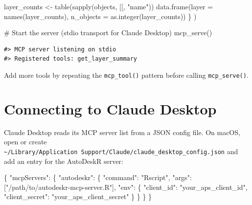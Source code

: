 \documentclass[
  11pt,
  letterpaper,
  DIV=11,
  numbers=noendperiod]{scrreprt}
\newenvironment{Shaded}{\begin{snugshade}}{\end{snugshade}}
\newcommand{\AttributeTok}[1]{\textcolor[rgb]{0.40,0.45,0.13}{#1}}
\newcommand{\CommentTok}[1]{\textcolor[rgb]{0.37,0.37,0.37}{#1}}
\newcommand{\DataTypeTok}[1]{\textcolor[rgb]{0.68,0.00,0.00}{#1}}
\newcommand{\FunctionTok}[1]{\textcolor[rgb]{0.28,0.35,0.67}{#1}}
\newcommand{\NormalTok}[1]{\textcolor[rgb]{0.00,0.23,0.31}{#1}}
\newcommand{\OtherTok}[1]{\textcolor[rgb]{0.00,0.23,0.31}{#1}}
\newcommand{\StringTok}[1]{\textcolor[rgb]{0.13,0.47,0.30}{#1}}
\begin{document}
\begin{Shaded}
\begin{Highlighting}[]
\NormalTok{    layer\_counts }\OtherTok{\textless{}{-}} \FunctionTok{table}\NormalTok{(}\FunctionTok{sapply}\NormalTok{(objects, }\StringTok{\textasciigrave{}}\AttributeTok{[[}\StringTok{\textasciigrave{}}\NormalTok{, }\StringTok{"name"}\NormalTok{))}
    \FunctionTok{data.frame}\NormalTok{(}\AttributeTok{layer =} \FunctionTok{names}\NormalTok{(layer\_counts),}
               \AttributeTok{n\_objects =} \FunctionTok{as.integer}\NormalTok{(layer\_counts))}
\NormalTok{  \}}
\NormalTok{)}

\CommentTok{\# Start the server (stdio transport for Claude Desktop)}
\FunctionTok{mcp\_serve}\NormalTok{()}
\end{Highlighting}
\end{Shaded}

\begin{verbatim}
#> MCP server listening on stdio
#> Registered tools: get_layer_summary
\end{verbatim}

Add more tools by repeating the \texttt{mcp\_tool()} pattern before
calling \texttt{mcp\_serve()}.

\section{Connecting to Claude
Desktop}\label{connecting-to-claude-desktop}

Claude Desktop reads its MCP server list from a JSON config file. On
macOS, open or create
\texttt{\textasciitilde{}/Library/Application\ Support/Claude/claude\_desktop\_config.json}
and add an entry for the AutoDeskR server:

\begin{Shaded}
\begin{Highlighting}[]
\FunctionTok{\{}
  \DataTypeTok{"mcpServers"}\FunctionTok{:} \FunctionTok{\{}
    \DataTypeTok{"autodeskr"}\FunctionTok{:} \FunctionTok{\{}
      \DataTypeTok{"command"}\FunctionTok{:} \StringTok{"Rscript"}\FunctionTok{,}
      \DataTypeTok{"args"}\FunctionTok{:} \OtherTok{[}\StringTok{"/path/to/autodeskr{-}mcp{-}server.R"}\OtherTok{]}\FunctionTok{,}
      \DataTypeTok{"env"}\FunctionTok{:} \FunctionTok{\{}
        \DataTypeTok{"client\_id"}\FunctionTok{:} \StringTok{"your\_aps\_client\_id"}\FunctionTok{,}
        \DataTypeTok{"client\_secret"}\FunctionTok{:} \StringTok{"your\_aps\_client\_secret"}
      \FunctionTok{\}}
    \FunctionTok{\}}
  \FunctionTok{\}}
\FunctionTok{\}}
\end{Highlighting}
\end{Shaded}
\end{document}
